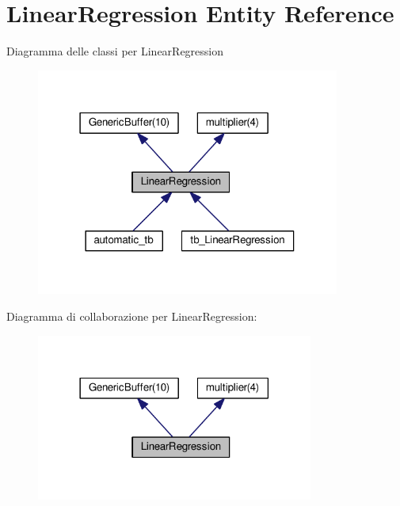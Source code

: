 \hypertarget{class_linear_regression}{\section{Linear\+Regression Entity Reference}
\label{class_linear_regression}
}


Diagramma delle classi per Linear\+Regression\nopagebreak
\begin{figure}[H]
\begin{center}
\leavevmode
\includegraphics[width=283pt]{class_linear_regression__inherit__graph}
\end{center}
\end{figure}


Diagramma di collaborazione per Linear\+Regression\+:\nopagebreak
\begin{figure}[H]
\begin{center}
\leavevmode
\includegraphics[width=258pt]{class_linear_regression__coll__graph}
\end{center}
\end{figure}
